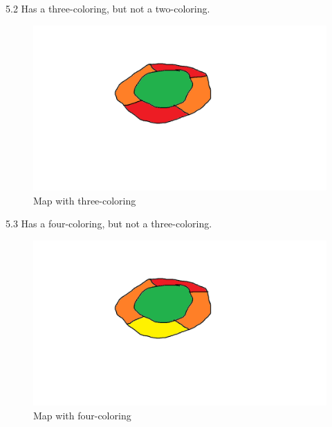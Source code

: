 \documentclass{article}
\begin{document}
\clearpage
\header
\item[]5.2 Has a three-coloring, but not a two-coloring.
\begin{figure}[h!]
  \includegraphics[width=\linewidth]{Untitled1.png}
  \caption{Map with three-coloring}
  \label{fig:map1}
\end{figure}

\clearpage
\header
\item[]5.3 Has a four-coloring, but not a three-coloring.
\begin{figure}[h!]
  \includegraphics[width=\linewidth]{Untitled2.png}
  \caption{Map with four-coloring}
  \label{fig:map1}
\end{figure}
\end{document}
